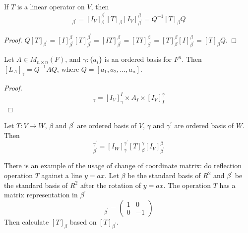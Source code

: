 \begin{theorem}\label{twoindextransform}
	If $T$ is a linear operator on $V$, then
	\begin{equation}
		[T]_{\beta^\prime} = [I_V]_{\beta}^{\beta^\prime} [T]_\beta [I_V]_{\beta^\prime}^\beta= Q^{-1} [T]_\beta Q 
	\end{equation}
\end{theorem}

\begin{proof}
    $Q [T]_{\beta^\prime} = [I]_{\beta^\prime}^\beta [T]_{\beta^\prime}^{\beta^\prime} = [I T]_{\beta^\prime}^\beta = [T I]_{\beta^\prime}^\beta = [T]_\beta^\beta [I]_{\beta^\prime}^\beta = [T]_\beta Q$.
\end{proof}

\begin{theorem}
    Let $A \in M_{n \times n} (F)$, and $\gamma:\{a_i\}$ is an ordered basis for $F^n$. Then $[L_A]_\gamma = Q^{-1} A Q$, where $Q = [a_1, a_2, \dots, a_n]$.
\end{theorem}

\begin{proof}
    \begin{equation*}
        [L_A]_\gamma = [I_V]_\gamma^I \times A_I \times [I_V]_I^\gamma
    \end{equation*}
\end{proof}


\begin{theorem} \label{specialchangeofcoordinates}
	Let $T:V\rightarrow W$, $\beta$ and $\beta^\prime$ are ordered basis of $V$, $\gamma$ and $\gamma^\prime$ are ordered basis of $W$. Then
	\begin{equation}
		[T]_{\beta^\prime}^{\gamma^\prime} = [I_W]_\gamma^{\gamma^\prime} [T]_\beta^\gamma [I_V]_{\beta^\prime}^\beta
	\end{equation}
\end{theorem}


\begin{example}
There is an example of the usage of change of coordinate matrix: do reflection operation $T$ against a line $y = a x$. Let $\beta$ be the standard basis of $R^2$ and $\beta^\prime$ be the standard basis of $R^2$ after the rotation of $y = a x$. The operation $T$ has a matrix representation in $\beta^\prime$
	\begin{equation*}
		[T]_{\beta^\prime} = \begin{pmatrix}
			1 & 0 \\
			0 & -1
		\end{pmatrix}		
	\end{equation*}
	Then calculate $[T]_\beta$ based on $[T]_{\beta^\prime}$.    
\end{example}

